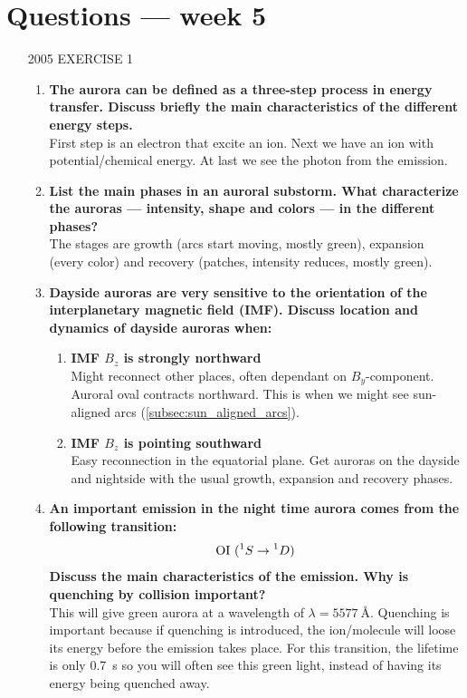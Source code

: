 \section{Questions --- week 5}
\begin{enumerate}
    \item [2005 EXERCISE 1]~\\\vspace{-5mm} \begin{enumerate}
        \item \textbf{The aurora can be defined as a three-step process in energy transfer. Discuss briefly the main characteristics of the different energy steps.}\\ First step is an electron that excite an ion. Next we have an ion with potential/chemical energy. At last we see the photon from the emission.
        \item \textbf{List the main phases in an auroral substorm. What characterize the auroras --- intensity, shape and colors --- in the different phases?}\\ The stages are growth (arcs start moving, mostly green), expansion (every color) and recovery (patches, intensity reduces, mostly green).
        \item \textbf{Dayside auroras are very sensitive to the orientation of the interplanetary magnetic field (IMF). Discuss location and dynamics of dayside auroras when:} \begin{enumerate}
            \item \textbf{IMF \(B_z\) is strongly northward}\\ Might reconnect other places, often dependant on \(B_y\)-component. Auroral oval contracts northward. This is when we might see sun-aligned arcs (\cref{subsec:sun_aligned_arcs}).
            \item \textbf{IMF \(B_z\) is pointing southward}\\ Easy reconnection in the equatorial plane. Get auroras on the dayside and nightside with the usual growth, expansion and recovery phases.
        \end{enumerate}
        \item \textbf{An important emission in the night time aurora comes from the following transition:}
        \begin{equation*}
            \textnormal{OI}~(\prescript{1}{}{S}\rightarrow\prescript{1}{}{D})
        \end{equation*}
        \textbf{Discuss the main characteristics of the emission. Why is quenching by collision important?}\\ This will give green aurora at a wavelength of \(\lambda=\SI{5577}{\angstrom}\). Quenching is important because if quenching is introduced, the ion/molecule will loose its energy before the emission takes place. For this transition, the lifetime is only \SI{0.7}{\second} so you will often see this green light, instead of having its energy being quenched away.

\end{enumerate}
\end{enumerate}
